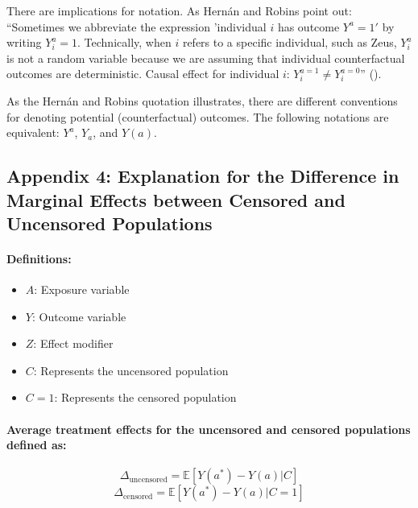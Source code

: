 \documentclass[
  singlecolumn]{article}
\let\oldparagraph\paragraph
\renewcommand{\paragraph}[1]{\oldparagraph{#1}\mbox{}}
\providecommand{\tightlist}{%
  \setlength{\itemsep}{0pt}\setlength{\parskip}{0pt}}\usepackage{longtable,booktabs,array}
\begin{document}
There are implications for notation. As Hernán and Robins point out:
``Sometimes we abbreviate the expression 'individual \(i\) has outcome
\(Y^a = 1'\) by writing \(Y^a_i = 1\). Technically, when \(i\) refers to
a specific individual, such as Zeus, \(Y^a_i\) is not a random variable
because we are assuming that individual counterfactual outcomes are
deterministic. Causal effect for individual \(i\):
\(Y^{a=1}_i \neq Y^{a=0}_i\)'' ().

As the Hernán and Robins quotation illustrates, there are different
conventions for denoting potential (counterfactual) outcomes. The
following notations are equivalent: \(Y^a\), \(Y_a\), and \(Y(a)\).

\newpage{}

\subsection{Appendix 4: Explanation for the Difference in Marginal
Effects between Censored and Uncensored
Populations}\label{appendix-4-explanation-for-the-difference-in-marginal-effects-between-censored-and-uncensored-populations}

\paragraph{Definitions:}\label{definitions}

\begin{itemize}
\tightlist
\item
  \textbf{\(A\)}: Exposure variable
\item
  \textbf{\(Y\)}: Outcome variable
\item
  \textbf{\(Z\)}: Effect modifier
\item
  \textbf{\(C\)}: Represents the uncensored population
\item
  \textbf{\(C=1\)}: Represents the censored population
\end{itemize}

\paragraph{Average treatment effects for the uncensored and censored
populations defined
as:}\label{average-treatment-effects-for-the-uncensored-and-censored-populations-defined-as}

\[
\Delta_{\text{uncensored}} = \mathbb{E}[Y(a^*) - Y(a) | C]
\] \[
\Delta_{\text{censored}} = \mathbb{E}[Y(a^*) - Y(a) | C=1]
\]
\end{document}
